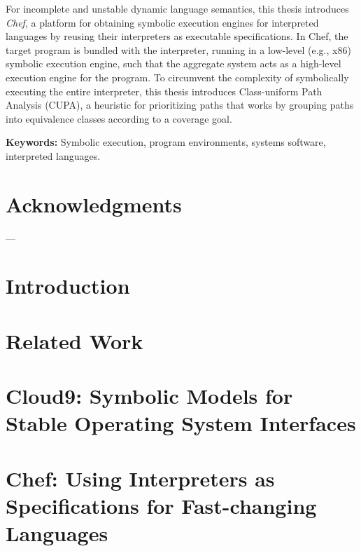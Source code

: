 \documentclass[letterpaper,10pt,oneside]{book}
\newcommand{\chef}{Chef\xspace}
\begin{document}
For incomplete and unstable dynamic language semantics, this thesis introduces \emph{\chef}, a platform for obtaining symbolic execution engines for interpreted languages by reusing their interpreters as executable specifications.  In \chef, the target program is bundled with the interpreter, running in a low-level (e.g., x86) symbolic execution engine, such that the aggregate system acts as a high-level execution engine for the program.
%
%
To circumvent the complexity of symbolically executing the entire interpreter, this thesis introduces Class-uniform Path Analysis (CUPA), a heuristic for prioritizing paths that works by grouping paths into equivalence classes according to a coverage goal.

\noindent \textbf{Keywords:} Symbolic execution, program environments, systems software, interpreted languages.


\chapter*{Acknowledgments}

---

\tableofcontents
\listoffigures
\listoftables

\chapter{Introduction}
\label{ch:introduction}



\chapter{Related Work}
\label{ch:relatedwork}



\chapter{Cloud9: Symbolic Models for Stable Operating System Interfaces}
\label{ch:cloud9}


\chapter{Chef: Using Interpreters as Specifications for Fast-changing Languages}
\label{ch:chef}

\end{document}
